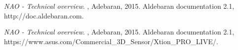 \begin{thebibliography}{1}

{\em NAO - Technical overview}.
\newblock \Btxtechreplong{}, Adebaran, 2015.
\newblock Aldebaran documentation 2.1, http://doc.aldebaran.com.

{\em NAO - Technical overview}.
\newblock \Btxtechreplong{}, Adebaran, 2015.
\newblock Aldebaran documentation 2.1, https://www.asus.com/Commercial\_3D\_Sensor/Xtion\_PRO\_LIVE/.

\end{thebibliography}
